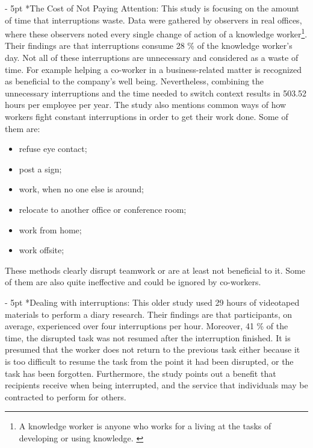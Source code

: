 \documentclass[11pt,singleside]{myfithesis2}
\makeatletter
\renewcommand\paragraph{
   \vspace{-10pt}
   \@startsection{paragraph}{4}{0mm}
      {\baselineskip}
      {- 5pt}
      {\normalfont\normalsize\bfseries}
}
\makeatother
\begin{document}
\paragraph*{The Cost of Not Paying Attention: } This study \cite{studyAttention} is focusing on the amount of time that interruptions waste. Data were gathered by observers in real offices, where these observers noted every single change of action of a knowledge worker\footnote{A knowledge worker is anyone who works for a living at the tasks of developing or using knowledge. \cite{knowledgeWorker}}. Their findings are that interruptions consume 28 \% of the knowledge worker's day. Not all of these interruptions are unnecessary and considered as a waste of time. For example helping a co-worker in a business-related matter is recognized as beneficial to the company's well being. Nevertheless, combining the unnecessary interruptions and the time needed to switch context results in 503.52 hours per employee per year. The study also mentions common ways of how workers fight constant interruptions in order to get their work done. Some of them are: \label{list:avoidingCommunication}
\begin{itemize}
	\item refuse eye contact;
	\item post a sign;
	\item work, when no one else is around;
	\item relocate to another office or conference room;
	\item work from home;
	\item work offsite;
\end{itemize}
These methods clearly disrupt teamwork or are at least not beneficial to it. Some of them are also quite ineffective and could be ignored by co-workers.
\paragraph*{Dealing with interruptions: } This older study \cite{studyDealingWithInterruptions} used 29 hours of videotaped materials to perform a diary research. Their findings are that participants, on average, experienced over four interruptions per hour. Moreover, 41 \% of the time, the disrupted task was not resumed after the interruption finished. It is presumed that the worker does not return to the previous task either because it is too difficult to resume the task from the point it had been disrupted, or the task has been forgotten. Furthermore, the study points out a benefit that recipients receive when being interrupted, and the service that individuals may be contracted to perform for others.
\end{document}
